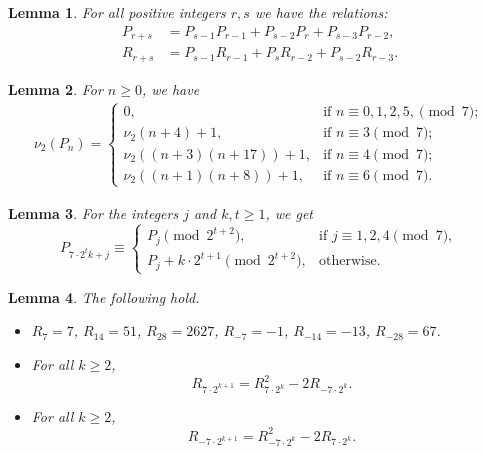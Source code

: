 \documentclass[10pt,a4paper]{amsart}
\newtheorem{lemma}{Lemma}
\begin{document}
\begin{lemma}\label{L1}
	For all positive integers $r,s$ we have the relations:
	\begin{align*}
		P_{r+s}&=P_{s-1}P_{r-1}+P_{s-2}P_{r}+P_{s-3}P_{r-2},\\
		R_{r+s}&=P_{s-1}R_{r-1}+P_{s}R_{r-2}+P_{s-2}R_{r-3}.
	\end{align*}
\end{lemma}

\begin{lemma}\label{L2}
	For $n\ge 0$, we have 
	\begin{align*}
		\nu_2\left(P_{n}\right)= 
		\begin{cases}
			0, & \mbox{if } n\equiv 0,1,2,5,\pmod{7};\\
			\nu_2(n+4)+1, & \mbox{if } n\equiv 3\pmod{7};\\
			\nu_2((n+3)(n+17))+1, & \mbox{if }  n\equiv 4\pmod{7};\\
			\nu_2((n+1)(n+8))+1, & \mbox{if }  n\equiv 6\pmod{7}.
		\end{cases}
	\end{align*}
\end{lemma}

\begin{lemma}\label{L4}
	For the integers $j$ and $k,t\ge 1$, we get
	$$
	P_{7\cdot 2^{t}k+j}\equiv\begin{cases}
		P_{j}\pmod{2^{t+2}}, & \text{if } j\equiv 1,2,4\pmod{7},\\
		P_{j}+k\cdot 2^{t+1}\pmod{2^{t+2}}, & \text{otherwise}.
	\end{cases}
	$$
\end{lemma}

\begin{lemma}\label{lem:doubling}
	The following hold.
	\begin{itemize}
		\item[\rm(i)] $R_7 = 7$, $R_{14} = 51$, $R_{28} = 2627$, 
		$R_{-7} = -1$, $R_{-14} = -13$, $R_{-28} = 67$.
		\item[\rm(ii)] For all $k \ge 2$,
		\begin{equation*}
			R_{7\cdot 2^{k+1}} = R_{7\cdot 2^k}^2 - 2R_{-7\cdot 2^k}.
		\end{equation*}
		\item[\rm(iii)] For all $k \ge 2$,
		\begin{equation*}
			R_{-7\cdot 2^{k+1}} = R_{-7\cdot 2^k}^2 - 2R_{7\cdot 2^k}.
		\end{equation*}
	\end{itemize}
\end{lemma}
\end{document}
